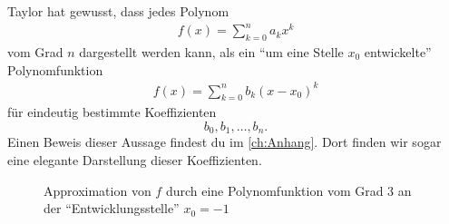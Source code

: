 Taylor hat gewusst, dass jedes Polynom
\begin{align*}
  f(x) = \sum_{k=0}^n a_kx^k 
\end{align*}
vom Grad $n$ dargestellt werden kann, als ein \enquote{um eine Stelle $x_0$ entwickelte} Polynomfunktion
\begin{align*}
  f(x) = \sum_{k=0}^n b_k(x-x_0)^k
\end{align*}
für eindeutig bestimmte Koeffizienten \[b_0, b_1, \ldots, b_n.\] Einen Beweis dieser Aussage findest du im \cref{ch:Anhang}. Dort finden wir sogar eine elegante Darstellung dieser Koeffizienten.

\clearpage
\begin{figure}[H]
  \begin{center}
  \end{center}
  \caption{Approximation von $f$ durch eine Polynomfunktion vom Grad 3 an der \enquote{Entwicklungsstelle} $x_0 = -1$}\label{fig:Taylor3}
\end{figure}


